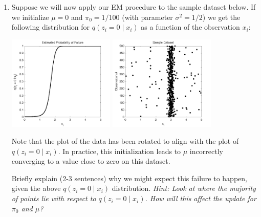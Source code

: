 \begin{enumerate}
\item {} Suppose we will now apply our EM procedure to the
  sample dataset below. If we initialize $\mu = 0$ and $\pi_0 = 1/100$
  (with parameter $\sigma^2 = 1/2$) we get the following distribution
  for $q(z_i = 0 \mid x_i)$ as a function of the observation $x_i$:
  \begin{center}
    \includegraphics[width=0.4\textwidth]{images/q_mean0.png}
    \includegraphics[width=0.4\textwidth]{images/range2.png}
  \end{center}
  Note that the plot of the data has been rotated to align with the
  plot of $q(z_i = 0 \mid x_i)$. In practice, this initialization
  leads to $\mu$ incorrectly converging to a value close to zero on
  this dataset.

  Briefly explain (2-3 sentences) why we might expect this failure to
  happen, given the above $q(z_i = 0 \mid x_i)$ distribution. {\em
    Hint: Look at where the majority of points lie with respect to
    $q(z_i = 0 \mid x_i)$. How will this affect the update for $\pi_0$
    and $\mu$?}

\end{enumerate}
